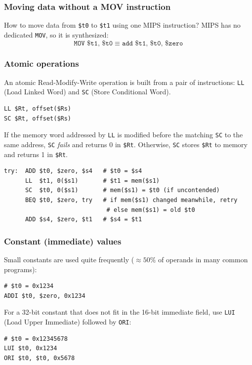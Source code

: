 \subsubsection{Moving data without a MOV instruction}

\begin{eg}
How to move data from \texttt{\$t0} to \texttt{\$t1} using one MIPS
instruction? MIPS has no dedicated \texttt{MOV}, so it is synthesized:
\[
  \texttt{MOV \$t1, \$t0} \;\equiv\; \texttt{add \$t1, \$t0, \$zero}
\]
\end{eg}

\subsubsection{Atomic operations}

\begin{definition}
An atomic Read-Modify-Write operation is built from a pair of instructions:
\texttt{LL} (Load Linked Word) and \texttt{SC} (Store Conditional Word).
\begin{lstlisting}
LL $Rt, offset($Rs)
SC $Rt, offset($Rs)
\end{lstlisting}
If the memory word addressed by \texttt{LL} is modified before the matching
\texttt{SC} to the same address, \texttt{SC} \emph{fails} and returns 0 in
\texttt{\$Rt}. Otherwise, \texttt{SC} stores \texttt{\$Rt} to memory and
returns 1 in \texttt{\$Rt}.
\end{definition}

\begin{eg}
\leavevmode
\begin{lstlisting}
try:  ADD $t0, $zero, $s4   # $t0 = $s4
      LL  $t1, 0($s1)       # $t1 = mem($s1)
      SC  $t0, 0($s1)       # mem($s1) = $t0 (if uncontended)
      BEQ $t0, $zero, try   # if mem($s1) changed meanwhile, retry
                             # else mem($s1) = old $t0
      ADD $s4, $zero, $t1   # $s4 = $t1
\end{lstlisting}
\end{eg}

\subsubsection{Constant (immediate) values}

Small constants are used quite frequently ($\approx 50\%$ of operands in
many common programs):
\begin{eg}
\leavevmode
\begin{lstlisting}
# $t0 = 0x1234
ADDI $t0, $zero, 0x1234
\end{lstlisting}
For a 32-bit constant that does not fit in the 16-bit immediate field, use
\texttt{LUI} (Load Upper Immediate) followed by \texttt{ORI}:
\begin{lstlisting}
# $t0 = 0x12345678
LUI $t0, 0x1234
ORI $t0, $t0, 0x5678
\end{lstlisting}
\end{eg}

